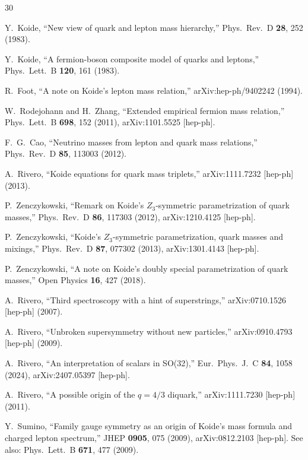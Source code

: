 \documentclass[prd,twocolumn,superscriptaddress,nofootinbib]{revtex4-2}
\begin{document}
\begin{thebibliography}{30}

Y.~Koide,
``New view of quark and lepton mass hierarchy,''
Phys.\ Rev.\ D \textbf{28}, 252 (1983).

Y.~Koide,
``A fermion-boson composite model of quarks and leptons,''
Phys.\ Lett.\ B \textbf{120}, 161 (1983).

R.~Foot,
``A note on Koide's lepton mass relation,''
arXiv:hep-ph/9402242 (1994).

W.~Rodejohann and H.~Zhang,
``Extended empirical fermion mass relation,''
Phys.\ Lett.\ B \textbf{698}, 152 (2011),
arXiv:1101.5525 [hep-ph].

F.~G.~Cao,
``Neutrino masses from lepton and quark mass relations,''
Phys.\ Rev.\ D \textbf{85}, 113003 (2012).

A.~Rivero,
``Koide equations for quark mass triplets,''
arXiv:1111.7232 [hep-ph] (2013).

P.~Zenczykowski,
``Remark on Koide's $Z_3$-symmetric parametrization of quark masses,''
Phys.\ Rev.\ D \textbf{86}, 117303 (2012),
arXiv:1210.4125 [hep-ph].

P.~Zenczykowski,
``Koide's $Z_3$-symmetric parametrization, quark masses and mixings,''
Phys.\ Rev.\ D \textbf{87}, 077302 (2013),
arXiv:1301.4143 [hep-ph].

P.~Zenczykowski,
``A note on Koide's doubly special parametrization of quark masses,''
Open Physics \textbf{16}, 427 (2018).

A.~Rivero,
``Third spectroscopy with a hint of superstrings,''
arXiv:0710.1526 [hep-ph] (2007).

A.~Rivero,
``Unbroken supersymmetry without new particles,''
arXiv:0910.4793 [hep-ph] (2009).

A.~Rivero,
``An interpretation of scalars in SO(32),''
Eur.\ Phys.\ J.\ C \textbf{84}, 1058 (2024),
arXiv:2407.05397 [hep-ph].

A.~Rivero,
``A possible origin of the $q=4/3$ diquark,''
arXiv:1111.7230 [hep-ph] (2011).

Y.~Sumino,
``Family gauge symmetry as an origin of Koide's mass formula and
charged lepton spectrum,''
JHEP \textbf{0905}, 075 (2009),
arXiv:0812.2103 [hep-ph].
See also: Phys.\ Lett.\ B \textbf{671}, 477 (2009).


\end{thebibliography}
\end{document}
